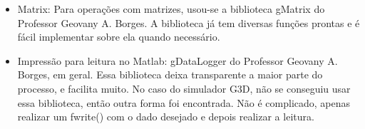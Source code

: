 \begin{itemize}
\begin{itemize}
\item Matrix: Para operações com matrizes, usou-se a biblioteca gMatrix
do Professor Geovany A. Borges. A biblioteca já tem diversas funções
prontas e é fácil implementar sobre ela quando necessário.
\item Impressão para leitura no Matlab: gDataLogger do Professor Geovany
A. Borges, em geral. Essa biblioteca deixa transparente a maior parte
do processo, e facilita muito. No caso do simulador G3D, não se conseguiu
usar essa biblioteca, então outra forma foi encontrada. Não é complicado,
apenas realizar um fwrite() com o dado desejado e depois realizar
a leitura.\end{itemize}
\end{itemize}

